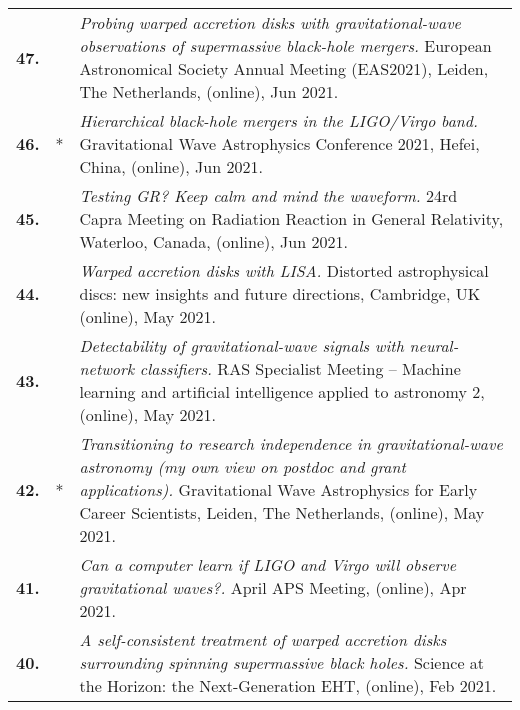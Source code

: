 {\begin{longtable}{rp{0.3cm}p{15.8cm}}
%
\textbf{47.} &  & \textit{Probing warped accretion disks with gravitational-wave observations of supermassive black-hole mergers.}
\newline{}
European Astronomical Society Annual Meeting (EAS2021), Leiden, The Netherlands, (online), Jun 2021.
\vspace{0.05cm}\\
%
\textbf{46.} & * & \textit{Hierarchical black-hole mergers in the LIGO/Virgo band.}
\newline{}
Gravitational Wave Astrophysics Conference 2021, Hefei, China, (online), Jun 2021.
\vspace{0.05cm}\\
%
\textbf{45.} &  & \textit{Testing GR? Keep calm and mind the waveform.}
\newline{}
24rd Capra Meeting on Radiation Reaction in General Relativity, Waterloo, Canada, (online), Jun 2021.
\vspace{0.05cm}\\
%
\textbf{44.} &  & \textit{Warped accretion disks with LISA.}
\newline{}
Distorted astrophysical discs: new insights and future directions, Cambridge, UK (online), May 2021.
\vspace{0.05cm}\\
%
\textbf{43.} &  & \textit{Detectability of gravitational-wave signals with neural-network classifiers.}
\newline{}
RAS Specialist Meeting -- Machine learning and artificial intelligence applied to astronomy 2, (online), May 2021.
\vspace{0.05cm}\\
%
\textbf{42.} & * & \textit{Transitioning to research independence in gravitational-wave astronomy (my own view on postdoc and grant applications).}
\newline{}
Gravitational Wave Astrophysics for Early Career Scientists, Leiden, The Netherlands, (online), May 2021.
\vspace{0.05cm}\\
%
\textbf{41.} &  & \textit{Can a computer learn if LIGO and Virgo will observe gravitational waves?.}
\newline{}
 April APS Meeting, (online), Apr 2021.
\vspace{0.05cm}\\
%
\textbf{40.} &  & \textit{A self-consistent treatment of warped accretion disks surrounding spinning supermassive black holes.}
\newline{}
Science at the Horizon: the Next-Generation EHT, (online), Feb 2021.

\end{longtable}}
